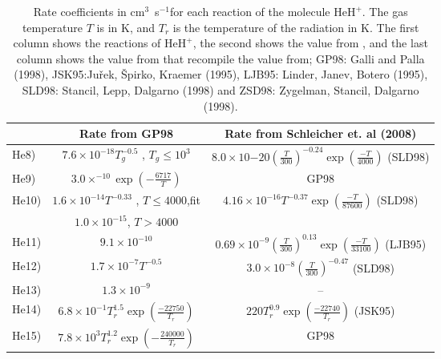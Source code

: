 \documentclass[baaa]{baaa}
\begin{document}
\begin{table*}[!t]
    \caption{Rate coefficients in cm$^3$~s$^{-1}$for each reaction of the molecule $\mathrm{HeH^+}$. The gas temperature $T$ is in $\mathrm{K}$, and $T_r$ is the temperature of the radiation in $\mathrm{K}$. The first column shows the reactions of $\mathrm{HeH^+}$, the second shows the value from \citet{GP98}, and the last column shows the value from \citet{Schleicher2008} that recompile the value from;  GP98: Galli and Palla (1998), JSK95:Juřek, Špirko, Kraemer (1995), LJB95: Linder, Janev, Botero (1995), SLD98: Stancil, Lepp, Dalgarno (1998) and ZSD98: Zygelman, Stancil, Dalgarno (1998). }
    \label{RateCoeffHEH+}
    \centering
    \begin{tabular}{lcc} 
         \hline\hline\noalign{\smallskip}
         &  Rate from GP98 & Rate from Schleicher et. al (2008)\\
         \hline\noalign{\smallskip}
He8) & $7.6\times 10^{-18}T_g^{-0.5}$ , $T_g \leq 10^3$ & $8.0 \times 10{-20} \left( \frac{T}{300} \right)^{-0.24} \exp \left( \frac{-T}{4000}\right)$ (SLD98) \\


He9) &  $3.0 \times ^{-10} \exp \left( -\frac{6717}{T} \right)$ & GP98 \\

He10) &  $1.6 \times 10^{-14} T^{-0.33}$ , $T \leq 4000$,fit   &  $4.16 \times 10^{-16} T^{-0.37} \exp \left( \frac{-T}{87600}\right)$ (SLD98) \\
&  $1.0 \times 10^{-15}$,  $T > 4000$  & \\

He11)& $9.1 \times 10^{-10}$ & $0.69 \times 10 ^{-9} \left( \frac{T}{300} \right)^{0.13} \exp \left( \frac{-T}{33100}\right)$ (LJB95)\\

He12) & $1.7 \times 10^{-7} T^{-0.5}$  & $3.0 \times 10^{-8} \left( \frac{T}{300} \right)^{-0.47}$ (SLD98) \\

He13) & $1.3\times 10^{-9}$ & -- \\
He14) & $6.8 \times 10^{-1} T_{r}^{1.5} \exp \left( \frac{-22750}{T_r}\right)$  & $220 T_r^{0.9} \exp \left( \frac{-22740}{T_r}\right)$ (JSK95) \\

He15)  & $7.8 \times 10^{3} T_r^{1.2} \exp \left( -\frac{240000}{T_r}\right)$ & GP98 \\ \hline
    \end{tabular}
    

\end{table*}
\end{document}
